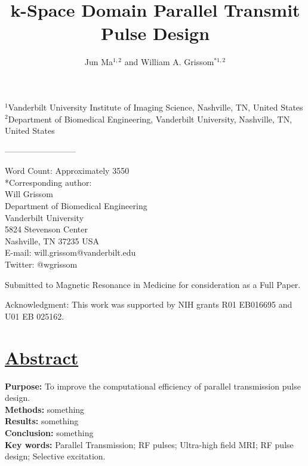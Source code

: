 \documentclass[11pt]{article}
\begin{document}
\title{k-Space Domain Parallel Transmit Pulse Design}
\author{Jun Ma$^{1,2}$ and William A. Grissom$^{*1,2}$}
\maketitle
\begin{flushleft}
$^1$Vanderbilt University Institute of Imaging Science, Nashville, TN, United States\\
$^2$Department of Biomedical Engineering, Vanderbilt University, Nashville, TN, United States\\    

\par
-------------------------- 

\par
Word Count: Approximately 3550 \\
*Corresponding author: \\
Will Grissom\\
Department of Biomedical Engineering\\
Vanderbilt University\\
5824 Stevenson Center\\
Nashville, TN 37235 USA \\
E-mail: will.grissom@vanderbilt.edu \\
Twitter: @wgrissom

\par Submitted to Magnetic Resonance in Medicine for consideration as a Full Paper.

\par
Acknowledgment: This work was supported by NIH grants R01 EB016695 and U01 EB 025162.

\end{flushleft}
\thispagestyle{plain}

\pagebreak


\section*{\underline{Abstract}} 
{\bf Purpose:}
To improve the computational efficiency of parallel transmission pulse design. 
\\[1em]
{\bf Methods:}
something
\\[1em]
{\bf Results:}
something
\\[1em]
{\bf Conclusion:}
something
\\[1em]
{\bf \noindent Key words:} Parallel Transmission; RF pulses; Ultra-high field MRI; RF pulse design; Selective excitation.

\pagebreak














\pagebreak



\pagebreak
\end{document}
